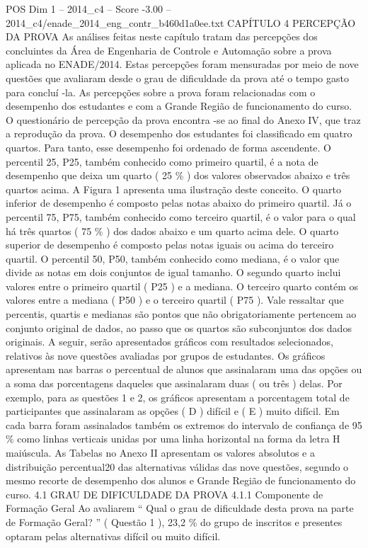 \begin{textsample}{POS Dim 1 – 2014\_c4 – Score -3.00 – 2014\_c4/enade\_2014\_eng\_contr\_b460d1a0ee.txt}  \label{ex:f1_pos_313}
CAPÍTULO 4 PERCEPÇÃO DA PROVA As análises feitas neste capítulo tratam das percepções dos concluintes da Área de Engenharia de Controle e Automação sobre a prova aplicada no ENADE/2014.
Estas percepções foram mensuradas por meio de nove questões que avaliaram desde o grau de dificuldade da prova até o tempo gasto para concluí -la.
As percepções sobre a prova foram relacionadas com o desempenho dos estudantes e com a Grande Região de funcionamento do curso.
O questionário de percepção da prova encontra -se ao final do Anexo IV, que traz a reprodução da prova.
O desempenho dos estudantes foi classificado em quatro quartos.
Para tanto, esse desempenho foi ordenado de forma ascendente.
O percentil 25, P25, também conhecido como primeiro quartil, é a nota de desempenho que deixa um quarto ( 25 \% ) dos valores observados abaixo e três quartos acima.
A Figura 1 apresenta uma ilustração deste conceito.
O quarto inferior de desempenho é composto pelas notas abaixo do primeiro quartil.
Já o percentil 75, P75, também conhecido como terceiro quartil, é o valor para o qual há três quartos ( 75 \% ) dos dados abaixo e um quarto acima dele.
O quarto superior de desempenho é composto pelas notas iguais ou acima do terceiro quartil.
O percentil 50, P50, também conhecido como mediana, é o valor que divide as notas em dois conjuntos de igual tamanho.
O segundo quarto inclui valores entre o primeiro quartil ( P25 ) e a mediana.
O terceiro quarto contém os valores entre a mediana ( P50 ) e o terceiro quartil ( P75 ).
Vale ressaltar que percentis, quartis e medianas são pontos que não obrigatoriamente pertencem ao conjunto original de dados, ao passo que os quartos são subconjuntos dos dados originais.
A seguir, serão apresentados gráficos com resultados selecionados, relativos às nove questões avaliadas por grupos de estudantes.
Os gráficos apresentam nas barras o percentual de alunos que assinalaram uma das opções ou a soma das porcentagens daqueles que assinalaram duas ( ou três ) delas.
Por exemplo, para as questões 1 e 2, os gráficos apresentam a porcentagem total de participantes que assinalaram as opções ( D ) difícil e ( E ) muito difícil.
Em cada barra foram assinalados também os extremos do intervalo de confiança de 95 \% como linhas verticais unidas por uma linha horizontal na forma da letra H maiúscula.
As Tabelas no Anexo II apresentam os valores absolutos e a distribuição percentual20 das alternativas válidas das nove questões, segundo o mesmo recorte de desempenho dos alunos e Grande Região de funcionamento do curso. 4.1 GRAU DE DIFICULDADE DA PROVA 4.1.1 Componente de Formação Geral Ao avaliarem “ Qual o grau de dificuldade desta prova na parte de Formação Geral? ” ( Questão 1 ), 23,2 \% do grupo de inscritos e presentes optaram pelas alternativas difícil ou muito difícil.

\end{textsample}
